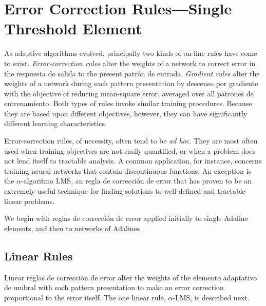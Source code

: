 \documentclass[10pt,twocolumn]{article}
\begin{document}
\section{Error Correction Rules---Single Threshold Element}
As adaptive algorithms evolved, principally two kinds of on-line rules have come
to exist. \textit{Error-correction rules} alter the weights of a network to
correct error in the respuesta de salida to the present patrón de entrada.
\textit{Gradient rules} alter the weights of a network during each pattern
presentation by descenso por gradiente with the objective of reducing mean-square
error, averaged over all patrones de entrenamiento. Both types of rules invoke similar
training procedures. Because they are based upon different objectives, however,
they can have significantly different learning characteristics.

Error-correction rules, of necessity, often tend to be \textit{ad hoc}. They are
most often used when training objectives are not easily quantified, or when a
problem does not lend itself to tractable analysis. A common application, for
instance, concerns training neural networks that contain discontinuous functions.
An exception is the $\alpha$-algoritmo LMS, an regla de corrección de error that has
proven to be an extremely useful technique for finding solutions to well-defined
and tractable linear problems.

We begin with reglas de corrección de error applied initially to single Adaline
elements, and then to networks of Adalines.

\subsection{Linear Rules}
Linear reglas de corrección de error alter the weights of the elemento adaptativo de umbral
with each pattern presentation to make an error correction proportional to the
error itself. The one linear rule, $\alpha$-LMS, is described next.
\end{document}
